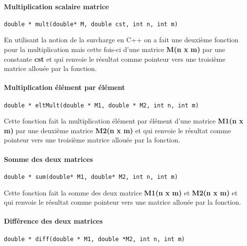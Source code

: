 \paragraph{Multiplication scalaire matrice}

\begin{verbatim}
double * mult(double* M, double cst, int n, int m)
\end{verbatim}

En utilisant la notion de la surcharge en C++ on a fait une deuxième fonction pour la multiplication mais cette fois-ci d'une matrice \textbf{M(n x m)} par une constante \textbf{cst} et qui renvoie le résultat comme pointeur vers une troisième matrice allouée par la fonction.


\paragraph{Multiplication élément par élément}
\begin{verbatim}
double * eltMult(double * M1, double * M2, int n, int m)
\end{verbatim}

Cette fonction fait la multiplication élément par élément d'une matrice \textbf{M1(n x m)} par une deuxième matrice \textbf{M2(n x m)} et qui renvoie le résultat comme pointeur vers une troisième matrice allouée par la fonction.

\paragraph{Somme des deux matrices}
\begin{verbatim}
double * sum(double* M1, double* M2, int n, int m)
\end{verbatim}

Cette fonction fait la somme des deux matrice \textbf{M1(n x m)} et \textbf{M2(n x m)} et qui renvoie le résultat comme pointeur vers une matrice allouée par la fonction.

\paragraph{Différence des deux matrices}
\begin{verbatim}
double * diff(double * M1, double *M2, int n, int m)
\end{verbatim}


